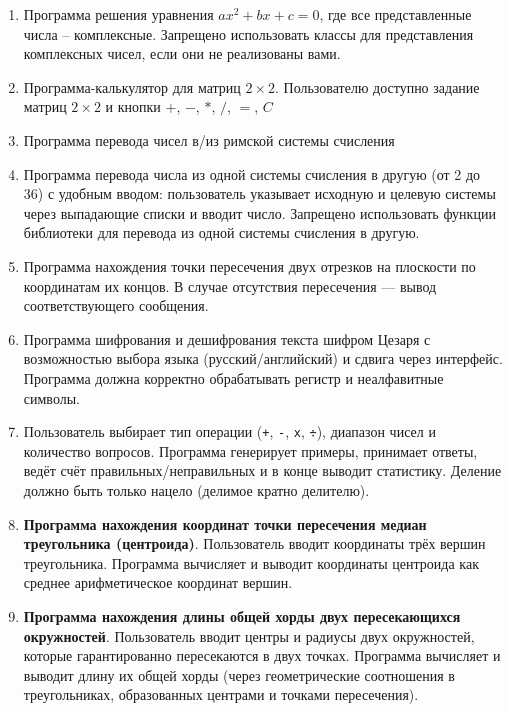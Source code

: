 \begin{enumerate}
\item[13] Программа решения уравнения $ax^2 + bx + c = 0$, 
где все представленные числа – комплексные. Запрещено использовать классы
для представления комплексных чисел, если они не реализованы вами.
\item[14] Программа-калькулятор для матриц $2\times 2$. 
Пользователю доступно задание матриц $2 \times 2$ и кнопки $+$,
$-$, $*$, $/$, $=$, $C$
\item[15] Программа перевода чисел в/из римской системы счисления
\item[16] Программа перевода числа из одной системы счисления в 
другую (от 2 до 36) с удобным вводом: пользователь указывает 
исходную и целевую системы через выпадающие списки и вводит число.
Запрещено использовать функции библиотеки для перевода из одной системы счисления
в другую.
\item[17]  Программа нахождения точки пересечения двух отрезков 
на плоскости по координатам их концов. 
В случае отсутствия пересечения — вывод соответствующего сообщения.
\item[18] Программа шифрования и дешифрования текста шифром Цезаря с 
возможностью выбора языка (русский/английский) и сдвига через интерфейс. 
Программа должна корректно обрабатывать регистр и неалфавитные символы.
\item[19]
Пользователь выбирает тип операции (\verb|+|, \verb|-|, \verb|x|, \verb|÷|), 
диапазон чисел и количество вопросов. Программа генерирует примеры, 
принимает ответы, ведёт счёт правильных/неправильных и в конце выводит статистику. 
Деление должно быть только нацело (делимое кратно делителю).
\item[20] \textbf{Программа нахождения координат точки пересечения медиан треугольника (центроида)}.
Пользователь вводит координаты трёх вершин треугольника. Программа вычисляет и выводит координаты центроида как среднее арифметическое координат вершин.
\item[21] \textbf{Программа нахождения длины общей хорды двух пересекающихся окружностей}.
Пользователь вводит центры и радиусы двух окружностей, которые гарантированно пересекаются в двух точках. Программа вычисляет и выводит длину их общей хорды (через геометрические соотношения в треугольниках, образованных центрами и точками пересечения).


\end{enumerate}
